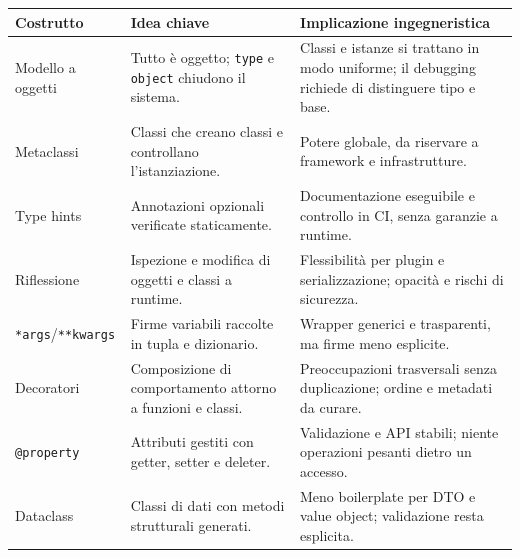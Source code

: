 \documentclass[12pt]{extarticle}
\begin{document}
\begin{center}
\small
\begin{tabular}{p{3.4cm}p{6.2cm}p{4.8cm}}
    \toprule
    \textbf{Costrutto} & \textbf{Idea chiave} & \textbf{Implicazione ingegneristica} \\
    \midrule
    Modello a oggetti & Tutto è oggetto; \texttt{type} e \texttt{object} chiudono il sistema. & Classi e istanze si trattano in modo uniforme; il debugging richiede di distinguere tipo e base. \\
    \addlinespace
    Metaclassi & Classi che creano classi e controllano l'istanziazione. & Potere globale, da riservare a framework e infrastrutture. \\
    \addlinespace
    Type hints & Annotazioni opzionali verificate staticamente. & Documentazione eseguibile e controllo in CI, senza garanzie a runtime. \\
    \addlinespace
    Riflessione & Ispezione e modifica di oggetti e classi a runtime. & Flessibilità per plugin e serializzazione; opacità e rischi di sicurezza. \\
    \addlinespace
    \texttt{*args}/\texttt{**kwargs} & Firme variabili raccolte in tupla e dizionario. & Wrapper generici e trasparenti, ma firme meno esplicite. \\
    \addlinespace
    Decoratori & Composizione di comportamento attorno a funzioni e classi. & Preoccupazioni trasversali senza duplicazione; ordine e metadati da curare. \\
    \addlinespace
    \texttt{@property} & Attributi gestiti con getter, setter e deleter. & Validazione e API stabili; niente operazioni pesanti dietro un accesso. \\
    \addlinespace
    Dataclass & Classi di dati con metodi strutturali generati. & Meno boilerplate per DTO e value object; validazione resta esplicita. \\
    \bottomrule
\end{tabular}
\end{center}
\end{document}
